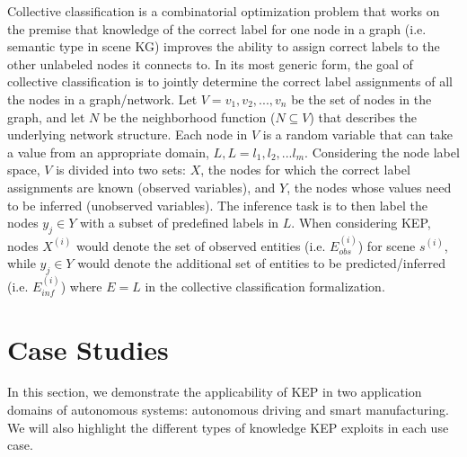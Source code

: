 \documentclass[conference]{IEEEtran}
\begin{document}
Collective classification is a combinatorial optimization problem that works on the premise that knowledge of the correct label for one node in a graph (i.e. semantic type in scene KG) improves the ability to assign correct labels to the other unlabeled nodes it connects to. In its most generic form, the goal of collective classification is to jointly determine the correct label assignments of all the nodes in a graph/network. Let $V={v_1, v_2,...,v_n}$ be the set of nodes in the graph, and let $N$ be the neighborhood function ($N \subseteq V$) that describes the underlying network structure\cite{Sen2010}. Each node in  $V$ is a random variable that can take a value from an appropriate domain, $L, L={l_1, l_2,...l_m}$. Considering the node label space, $V$ is divided into two sets: $X$, the nodes for which the correct label assignments are known (observed variables), and $Y$, the nodes whose values need to be inferred (unobserved variables). The inference task is to then label the nodes  $y_j \in Y$ with a subset of predefined labels in $L$. When considering KEP, nodes $X^{(i)}$ would denote the set of observed entities (i.e. $E^{(i)}_{obs}$) for scene $s^{(i)}$, while $y_j \in Y$ would denote the additional set of entities to be predicted/inferred (i.e. $E^{(i)}_{inf}$) where $E=L$ in the collective classification formalization.


\section{Case Studies}
\label{sec:case-studies}

In this section, we demonstrate the applicability of KEP in two application domains of autonomous systems: autonomous driving and smart manufacturing. We will also highlight the different types of knowledge KEP exploits in each use case.
\end{document}
